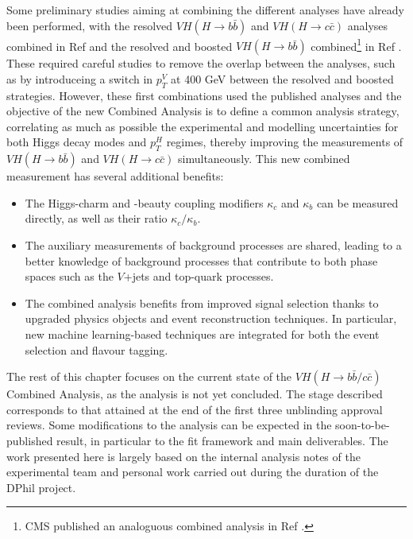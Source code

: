 Some preliminary studies aiming at combining the different analyses have already been performed, with the resolved $VH (H\rightarrow b\bar{b})$ and $VH (H\rightarrow c\bar{c})$ analyses combined in Ref \cite{Collaboration:2721696} and the resolved and boosted $VH (H \rightarrow b\bar{b})$ combined\footnote{CMS published an analoguous combined analysis in Ref \cite{CMS-PAS-HIG-20-001}.} in Ref \cite{ATLAS:2021wqh}. These required careful studies to remove the overlap between the analyses, such as by introduceing a switch in $p_T^V$ at 400 GeV between the resolved and boosted strategies. However, these first combinations used the published analyses and the objective of the new Combined Analysis is to define a common analysis strategy, correlating as much as possible the experimental and modelling uncertainties for both Higgs decay modes and $p_T^H$ regimes, thereby improving the measurements of $VH (H \rightarrow b\bar{b})$ and $VH (H \rightarrow c\bar{c})$ simultaneously. This new combined measurement has several additional benefits: 
\begin{itemize}
\item The Higgs-charm and -beauty coupling modifiers $\kappa_c$ and $\kappa_b$ can be measured directly, as well as their ratio $\kappa_c/\kappa_b$. 
\item The auxiliary measurements of background processes are shared, leading to a better knowledge of background processes that contribute to both phase spaces such as the $V$+jets and top-quark processes.
\item The combined analysis benefits from improved signal selection thanks to upgraded physics objects and event reconstruction techniques. In particular, new machine learning-based techniques are integrated for both the event selection and flavour tagging.
\end{itemize}

The rest of this chapter focuses on the current state of the $VH (H\rightarrow b\bar{b}/c\bar{c})$ Combined Analysis, as the analysis is not yet concluded. The stage described corresponds to that attained at the end of the first three unblinding approval reviews. Some modifications to the analysis can be expected in the soon-to-be-published result, in particular to the fit framework and main deliverables. The work presented here is largely based on the internal analysis notes of the experimental team and personal work carried out during the duration of the DPhil project. 

